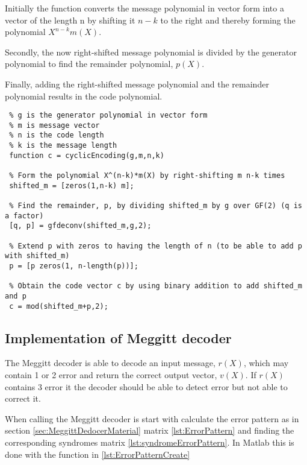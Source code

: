 \documentclass[Main]{subfiles}
\begin{document}
\noindent Initially the function converts the message polynomial in vector form into a vector of the length n by shifting it $n-k$ to the right and thereby forming the polynomial $X^{n-k}m(X)$. 

\noindent Secondly, the now right-shifted message polynomial is divided by the generator polynomial to find the remainder polynomial, $p(X)$.

\noindent Finally, adding the right-shifted message polynomial and the remainder polynomial results in the code polynomial.  

\begin{lstlisting}[caption=Cyclic Encoder, style=Code-Matlab, label=lst:refID]
 % cyclicEncoding is a function that encodes a message vector into systematic code given the following parameters
 % g is the generator polynomial in vector form
 % m is message vector
 % n is the code length
 % k is the message length
 function c = cyclicEncoding(g,m,n,k)

 % Form the polynomial X^(n-k)*m(X) by right-shifting m n-k times 
 shifted_m = [zeros(1,n-k) m];

 % Find the remainder, p, by dividing shifted_m by g over GF(2) (q is a factor)
 [q, p] = gfdeconv(shifted_m,g,2);

 % Extend p with zeros to having the length of n (to be able to add p with shifted_m)
 p = [p zeros(1, n-length(p))];

 % Obtain the code vector c by using binary addition to add shifted_m and p 
 c = mod(shifted_m+p,2);
\end{lstlisting}

\subsection{Implementation of Meggitt decoder}
\label{sec:ImplementMeggittDecoder}
The Meggitt decoder is able to decode an input message, $r(X)$, which may contain 1 or 2 error and return the correct output vector, $v(X)$.
If $r(X)$ contains 3 error it the decoder should be able to detect error but not able to correct it.

When calling the Meggitt decoder is start with calculate the error pattern as in section \ref{sec:MeggittDedocerMaterial} matrix \ref{lst:ErrorPattern} and finding the corresponding syndromes matrix \ref{lst:syndromeErrorPattern}.
In Matlab this is done with the function in \codeTitle \ref{lst:ErrorPatternCreate} 
\end{document}
